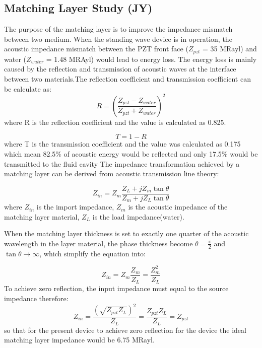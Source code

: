 \documentclass[11pt,a4paper]{article}
\begin{document}
\subsection{Matching Layer Study (JY)}

The purpose of the matching layer is to improve the impedance mismatch between two medium\cite{zhou2009alumina}. When the standing wave device is in operation, the acoustic impedance mismatch between the PZT front face ($Z_{pzt}$ = 35  MRayl) and water ($Z_{water}$ =  1.48 MRAyl) would lead to energy loss. The energy loss is mainly caused by the reflection and transmission of acoustic waves at the interface between two materials.The reflection coefficient and transmission coefficient can be calculate as\cite{rathod2020review}:
\begin{equation}
R = \left( \frac{Z_{pzt} - Z_{water}}{Z_{pzt} + Z_{water}} \right)^2
\end{equation}
where R is the reflection coefficient and the value is calculated as 0.825.

\begin{equation}
T = 1 - R
\end{equation}
where T is the transmission coefficient and the value was calculated as 0.175 which mean 82.5$\%$ of acoustic energy would be reflected and only 17.5$\%$ would be transmitted to the fluid cavity
The impedance transformation achieved by a matching layer can be derived from acoustic transmission line theory\cite{rathod2020review}: 

\begin{equation}
Z_{in} = Z_m \frac{Z_L + j Z_m \tan\theta}{Z_m + j Z_L \tan\theta}
\end{equation}
where $Z_{in}$ is the import impedance, $Z_m$ is the acoustic impedance of the matching layer material, $Z_L$ is the  load impedance(water).

When the matching layer thickness is set to exactly one quarter of the acoustic wavelength in the layer material, the phase thickness become $\theta = \frac{\pi}{2} $ and $\tan\theta \to \infty$, which simplify the equation into\cite{rathod2020review}:

\begin{equation}
Z_{in} = Z_m \frac{Z_m}{Z_L} = \frac{Z_m^2}{Z_L}
\end{equation}
To achieve zero reflection, the input impedance must equal to the source impedance therefore:
\begin{equation}
Z_{in} = \frac{\left(\sqrt{Z_{pzt} Z_L}\right)^2}{Z_L}
= \frac{Z_{pzt} Z_L}{Z_L}
= Z_{pzt}
\end{equation}
so that for the present device to achieve zero reflection for the device the ideal matching layer impedance would be 6.75 MRayl.
\end{document}
